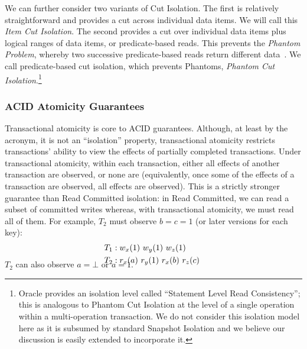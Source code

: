 We can further consider two variants of Cut Isolation. The first is
relatively straightforward and provides a cut across individual data
items. We will call this \textit{Item Cut Isolation}. The second
provides a cut over individual data items plus logical ranges of data
items, or predicate-based reads. This prevents the \textit{Phantom
  Problem}, whereby two successive predicate-based reads return
different data~\cite{gray-isolation}. We call predicate-based cut
isolation, which prevents Phantoms, \textit{Phantom Cut
  Isolation}.\footnote{Oracle provides an isolation level called
  ``Statement Level Read Consistency''; this is analogous to Phantom
  Cut Isolation at the level of a single operation within a
  multi-operation transaction. We do not consider this isolation model
  here as it is subsumed by standard Snapshot Isolation and we believe
  our discussion is easily extended to incorporate it.}

\subsubsection{ACID Atomicity Guarantees}

Transactional atomicity is core to ACID guarantees. Although, at least
by the acronym, it is not an ``isolation'' property, transactional
atomicity restricts transactions' ability to view the effects of
partially completed transactions. Under transactional atomicity,
within each transaction, either all effects of another transaction are
observed, or none are (equivalently, once some of the effects of a
transaction are observed, all effects are observed). This is a
strictly stronger guarantee than Read Committed isolation: in Read
Committed, we can read a subset of committed writes whereas, with
transactional atomicity, we must read all of them. For example, $T_2$
must observe $b=c=1$ (or later versions for each key):
\vspace{-.5em}
\begin{align*}
\small
T_1 &: w_x(1)~w_y(1)~w_z(1)
\\T_2 &: r_x(a)~r_y(1)~r_x(b)~r_z(c)~\\[-1.5em]
\end{align*}
$T_2$ can also observe $a=\bot$ or $a=1$.


